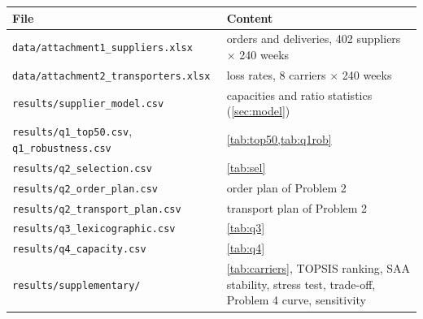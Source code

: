 \documentclass[11pt,a4paper]{article}
\begin{document}
\begin{center}
\small
\begin{tabular}{lp{}}
\toprule
File & Content \\
\midrule
\texttt{data/attachment1\_suppliers.xlsx} & orders and deliveries, 402 suppliers $\times$ 240 weeks \\
\texttt{data/attachment2\_transporters.xlsx} & loss rates, 8 carriers $\times$ 240 weeks \\
\texttt{results/supplier\_model.csv} & capacities and ratio statistics (\cref{sec:model}) \\
\texttt{results/q1\_top50.csv}, \texttt{q1\_robustness.csv} & \cref{tab:top50,tab:q1rob} \\
\texttt{results/q2\_selection.csv} & \cref{tab:sel} \\
\texttt{results/q2\_order\_plan.csv} & order plan of Problem 2 \\
\texttt{results/q2\_transport\_plan.csv} & transport plan of Problem 2 \\
\texttt{results/q3\_lexicographic.csv} & \cref{tab:q3} \\
\texttt{results/q4\_capacity.csv} & \cref{tab:q4} \\
\texttt{results/supplementary/} & \cref{tab:carriers}, TOPSIS ranking, SAA stability, stress test, trade-off, Problem 4 curve, sensitivity \\
\bottomrule
\end{tabular}
\end{center}
\end{document}
